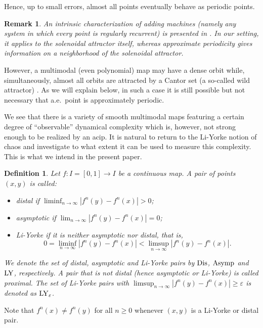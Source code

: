 \documentclass[12pt, psamsfonts, reqno]{amsart}
\newtheorem{definition}[theorem]{Definition}
\newtheorem{remark}[theorem]{Remark}
\begin{document}
Hence, up to small
errors, almost all points eventually behave as periodic points.

\begin{remark}
An intrinsic characterization of adding machines (namely any
system in which every point is regularly recurrent) is presented
in \cite{BK}. In our setting, it applies to the solenoidal
attractor itself, whereas approximate periodicity gives
information on a neighborhood of the solenoidal attractor.
\end{remark}

However, a multimodal (even polynomial) map may have a dense orbit
while, simultaneously, almost all orbits are attracted by a Cantor
set (a so-called wild attractor) \cite{BKNS}. As we will explain
below, in such a case it is still possible but not necessary that
a.e.\ point is approximately periodic.

We see that there is a variety of smooth multimodal maps featuring
a certain degree of ``observable'' dynamical complexity which is,
however, not strong enough to be realized by an acip. It is natural to
return to the Li-Yorke notion of chaos and investigate to
what extent it can be used to measure this complexity. This is
what we intend in the present paper.

\begin{definition} \label{def:basic}
Let $f:I =[0,1]\to I$ be a continuous map. A pair of points
$(x,y)$ is called:
\begin{itemize}
\item \emph{distal} if $\liminf_{n\to\infty} |f^n(y)-f^n(x)| > 0$;\\
\item \emph{asymptotic} if $\lim_{n\to\infty} |f^n(y)-f^n(x)| = 0$;\\
\item \emph{Li-Yorke} if it is neither asymptotic nor distal, that is,
$$
0 = \liminf_{n\to\infty} |f^n(y)- f^n(x)| < \limsup_{n\to\infty}
|f^n(y)- f^n(x)|.
$$
\end{itemize}
We denote the set of distal, asymptotic and Li-Yorke pairs by
${\mathop{\rm Dis}\nolimits}$, ${\mathop{\rm Asymp}\nolimits}$ and ${\mathop{\rm LY}\nolimits}$, respectively.
A pair that is not distal (hence asymptotic or Li-Yorke)
is called {\em proximal}. The set of Li-Yorke
pairs with $\limsup_{n\to\infty} |f^n(y)- f^n(x)| \geq {\varepsilon}$ is
denoted as ${\mathop{\rm LY}\nolimits}_{\varepsilon}$.
\end{definition}

Note that $f^n(x) \neq f^n(y)$ for all $n \geq 0$ whenever $(x,y)$
is a Li-Yorke or distal pair.
\end{document}
